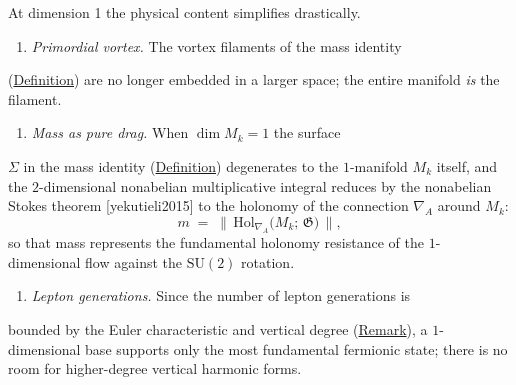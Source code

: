\begin{remark}
  \label{rem:descent-physical}
At dimension 1 the physical content simplifies drastically.

\begin{enumerate}
  \item \emph{Primordial vortex.}  The vortex filaments of the mass identity
\end{enumerate}
   (\hyperref[def:mass-identity]{Definition}) are no longer embedded in a larger
   space; the entire manifold \emph{is} the filament.
\begin{enumerate}
  \item \emph{Mass as pure drag.}  When $\dim M_k = 1$ the surface
\end{enumerate}
   $\Sigma$ in the mass identity
   (\hyperref[def:mass-identity]{Definition}) degenerates to the
   $1$-manifold $M_k$ itself, and the $2$-dimensional nonabelian
   multiplicative integral reduces by the nonabelian Stokes
   theorem [yekutieli2015] to the holonomy of the connection
   $\nabla_A$ around $M_k$:
\[
m \;=\;
     \bigl\lVert\,
     \mathrm{Hol}_{\nabla_A}\!\bigl(M_k;\, \mathfrak{G}\bigr)
     \,\bigr\rVert,
\]
   so that mass represents the fundamental holonomy resistance of
   the $1$-dimensional flow against the $\mathrm{SU}(2)$ rotation.
\begin{enumerate}
  \item \emph{Lepton generations.}  Since the number of lepton generations is
\end{enumerate}
   bounded by the Euler characteristic and vertical degree
   (\hyperref[rem:betti-numbers-brane]{Remark}), a $1$-dimensional base supports
   only the most fundamental fermionic state; there is no room for
   higher-degree vertical harmonic forms.
\end{remark}

